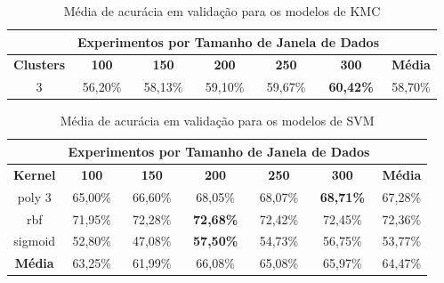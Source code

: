 \begin{table}[H]
\scriptsize
\centering
\caption{Média de acurácia em validação para os modelos de KMC} 
\label{table:kmc_results_tipo_superficie_1}
\begin{tabular}{ccccccc}
\cmidrule(lr){2-6}
& \multicolumn{5}{c}{\textbf{Experimentos por Tamanho de Janela de Dados}} & \multicolumn{1}{c}{} \\ \midrule
\textbf{Clusters} & \textbf{100} & \textbf{150} & \textbf{200} & \textbf{250} & \textbf{300} & \textbf{Média} \\ \midrule
3 & 56,20\% & 58,13\% &  59,10\% & 59,67\% & \cellcolor[HTML]{34FF34}\textbf{60,42\%} & 58,70\% \\ \bottomrule
\end{tabular}
\end{table}

\begin{table}[H]
\scriptsize
\centering
\caption{Média de acurácia em validação para os modelos de SVM} 
\label{table:svm_results_tipo_superficie_1}
\begin{tabular}{ccccccc}
\cmidrule(lr){2-6}
& \multicolumn{5}{c}{\textbf{Experimentos por Tamanho de Janela de Dados}} & \multicolumn{1}{c}{} \\ \midrule
\textbf{Kernel} & \textbf{100} & \textbf{150} & \textbf{200} & \textbf{250} & \textbf{300} & \textbf{Média} \\ \midrule
poly 3 & 65,00\% & 66,60\% & 68,05\% & 68,07\% & \textbf{68,71\%} & 67,28\% \\ \midrule
rbf & 71,95\% & 72,28\% & \cellcolor[HTML]{34FF34}\textbf{72,68\%} & 72,42\% & 72,45\% & 72,36\% \\ \midrule
sigmoid & 52,80\% & 47,08\% & \textbf{57,50\%} & 54,73\% & 56,75\% & 53,77\% \\ \midrule
\textbf{Média} & 63,25\% & 61,99\% & 66,08\% & 65,08\% & 65,97\% & 64,47\% \\ \bottomrule
\end{tabular}
\end{table}

